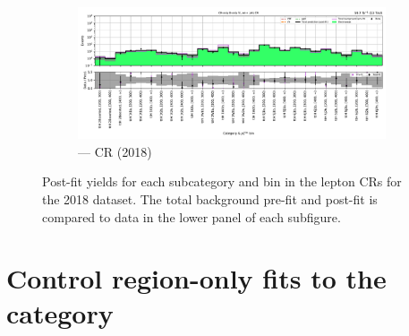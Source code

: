 \begin{figure}[htbp]
    \begin{subfigure}[b]{0.65\textwidth}
        \includegraphics[width=\textwidth]{chapters/higgstoinv/figures/mountain_ranges/2018/ttH/Zee_tree_fit_b-abs_values_ttH_cats.pdf}
        \caption{\ttH --- \doubleEleCr \gls{CR} (2018)}
    \end{subfigure}
    \caption[Post-fit yields for each \ttH subcategory and \ptmiss bin in the lepton control regions for the 2018 dataset]{Post-fit yields for each \ttH subcategory and \ptmiss bin in the lepton \glspl{CR} for the 2018 dataset. The total background pre-fit and post-fit is compared to data in the lower panel of each subfigure.}
    \label{fig:htoinv_mountain_range_ttH_2018_CRs}
\end{figure}

\clearpage




\section{Control region-only fits to the \texorpdfstring{\VH}{VH} category}
\label{sec:pre_post_fit_plots_VH_CRs}

